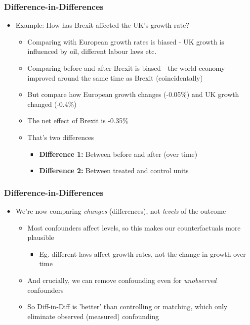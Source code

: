 \documentclass[xcolor=x11names,compress]{beamer}\usepackage[]{graphicx}\usepackage[]{color}
\renewcommand{\(}{\begin{columns}}
\renewcommand{\)}{\end{columns}}
\newcommand{\<}[1]{\begin{column}{#1}}
\renewcommand{\>}{\end{column}}
\begin{document}
\begin{frame}
\frametitle{Difference-in-Differences}
\begin{itemize}
\item Example: How has Brexit affected the UK's growth rate?
\pause
\begin{itemize}
\item Comparing with European growth rates is biased - UK growth is influenced by oil, different labour laws etc.
\pause
\item Comparing before and after Brexit is biased - the world economy improved around the same time as Brexit (coincidentally)
\pause
\item But compare how European growth changes (-0.05\%) and UK growth changed (-0.4\%)
\pause
\item The net effect of Brexit is -0.35\%
\pause
\item That's two differences
\begin{itemize}
\item \textbf{Difference 1:} Between before and after (over time)
\item \textbf{Difference 2:} Between treated and control units
\pause
\end{itemize}
\end{itemize}
\end{itemize}
\end{frame}

\begin{frame}
\frametitle{Difference-in-Differences}
\begin{itemize}
\item We're now comparing \textit{changes} (differences), not \textit{levels} of the outcome
\begin{itemize}
\item Most confounders affect levels, so this makes our counterfactuals more plausible
\begin{itemize}
\item Eg. different laws affect growth rates, not the change in growth over time
\end{itemize}
\item And crucially, we can remove confounding even for \textit{unobserved} confounders
\item So Diff-in-Diff is 'better' than controlling or matching, which only eliminate observed (measured) confounding
\end{itemize}
\end{itemize}
\end{frame}
\end{document}
